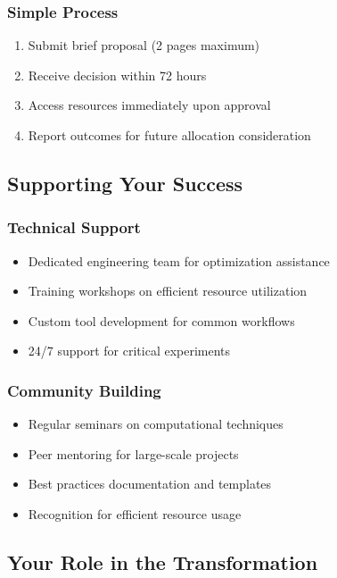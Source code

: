 \subsubsection{Simple Process}
\begin{enumerate}
\item Submit brief proposal (2 pages maximum)
\item Receive decision within 72 hours
\item Access resources immediately upon approval
\item Report outcomes for future allocation consideration
\end{enumerate}

\subsection{Supporting Your Success}

\subsubsection{Technical Support}
\begin{itemize}
\item Dedicated engineering team for optimization assistance
\item Training workshops on efficient resource utilization
\item Custom tool development for common workflows
\item 24/7 support for critical experiments
\end{itemize}

\subsubsection{Community Building}
\begin{itemize}
\item Regular seminars on computational techniques
\item Peer mentoring for large-scale projects
\item Best practices documentation and templates
\item Recognition for efficient resource usage
\end{itemize}

\subsection{Your Role in the Transformation}


